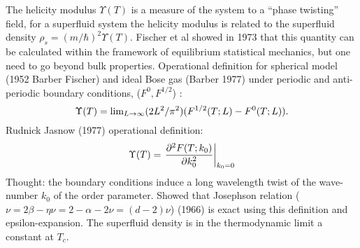 The helicity modulus $\Upsilon(T)$ is a measure of the system to a ``phase twisting'' field, for a superfluid system the helicity modulus is related to the superfluid density
$\rho_s = (m/\hbar)^2 \Upsilon(T)$.
Fischer et al showed in 1973 that this quantity can be calculated within the framework of equilibrium statistical mechanics, but one need to go beyond bulk properties.
Operational definition for spherical model (1952 Barber Fischer) and ideal Bose gas (Barber 1977) under periodic and anti-periodic boundary conditions, ($F^{0},F^{1/2}$) :
\begin{equation}
  \Upsilon(T) = \textrm{lim}_{L\rightarrow \infty} (2L^2/\pi^2) (F^{1/2} (T;L)-F^0(T;L)).
  \label{}
\end{equation}
Rudnick Jasnow (1977) operational definition: 
\begin{equation}
  \Upsilon(T) = \left. \frac{  \partial^2F(T;k_0)}{\partial k^2_0}\right|_{k_0 =0}
  \label{}
\end{equation}
Thought: the boundary conditions induce a long wavelength twist of the wave-number $k_0$ of the order parameter.
Showed that Josephson relation ($\nu = 2\beta -\eta\nu = 2 - \alpha -2\nu = (d -2)\nu$) (1966) is exact using this definition and epsilon-expansion.
The superfluid density is in the thermodynamic limit a constant at $T_c$.



